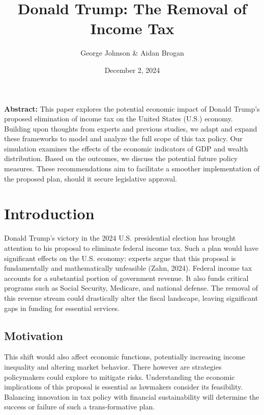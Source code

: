 \documentclass[12pt,letterpaper]{article}
\begin{document}
\title{\textbf{Donald Trump: The Removal of Income Tax}}
\author{George Johnson \& Aidan Brogan}
\date{December 2, 2024}
\maketitle

\textbf{Abstract:} This paper explores the potential economic impact of Donald Trump's proposed elimination of income tax on the United States (U.S.) economy. Building upon thoughts from experts and previous studies, we adapt and expand these frameworks to model and analyze the full scope of this tax policy. Our simulation examines the effects of the economic indicators of GDP and wealth distribution. Based on the outcomes, we discuss the potential future policy measures. These recommendations aim to facilitate a smoother implementation of the proposed plan, should it secure legislative approval.

\newpage
\section{Introduction}

 \indent Donald Trump's victory in the 2024 U.S. presidential election has brought attention to his proposal to eliminate federal income tax. Such a plan would have significant effects on the U.S. economy: experts argue that this proposal is fundamentally and mathematically unfeasible (Zahn, 2024). Federal income tax accounts for a substantial portion of government revenue. It also funds critical programs such as Social Security, Medicare, and national defense. The removal of this revenue stream could drastically alter the fiscal landscape, leaving significant gaps in funding for essential services.
 
\subsection{Motivation}

 \indent This shift would also affect economic functions, potentially increasing income inequality and altering market behavior. There however are strategies policymakers could explore to mitigate risks. Understanding the economic implications of this proposal is essential as lawmakers consider its feasibility. Balancing innovation in tax policy with financial sustainability will determine the success or failure of such a trans-formative plan.
\end{document}
